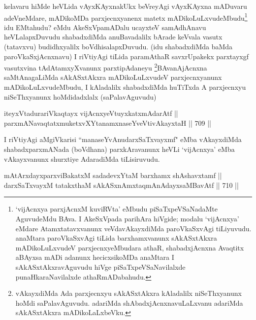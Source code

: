 \begin{artha} 
kelavaru hiMde heVLida vAyxKAyxnakUkx beVreyAgi vAyxKAyxna mADuvaru 
adeVneMdare, mADikoMDa parxjecnxyanenx matetx 
mADikoLuLxvudeMbudu\footnote{`vijAcnxya parxjAcnxM kuviRVta' eMbudu 
piSaTxpeVSaNadaMte AguvudeMdu BAva. I AkeSxVpada parihAra hiVgide; 
modalu `vijAcnxya' eMdare Atamxtatavxvanunx veVdavAkayxdiMda 
paroVkaSxvAgi tiLiyuvudu. anaMtara paroVkaSxvAgi tiLida barxhamxvanunx 
sAkASxtAkxra mADikoLuLxvudeV parxjecnxyeMbudara athaR, shabadxjAcnxna 
Avaqtitx aBAyxsa mADi adanunx hecicxsikoMDa anaMtara I 
sAkASxtAkxravAguvudu hiVge piSaTxpeVSaNavilalxde punaHkaraNavilalxde 
athaRmADabahudu.} idu EMtahudu? eMdu AkeSxVpamADalu 
ucayxteV samAdhAnavu heVLalapxDuvudu \ndash  shabadxdiMda anuBavadalilx 
bArade keVvala vasutx (tatavxvu) budidhxyalilx boVdhisalapxDuvudu. 
(idu shabadxdiMda baMda paroVkaSxjAcnxnavu) I riVtiyAgi tiLida 
paramAthaR savxrUpakekx parxtayxgf vasutxvina tAdAtamxyXvanunx 
parxtipAdaneyu \footnote{vAkayxdiMda Ada parxjecnxyu sAkASxtAkxra 
kAladalilx niSeThxyanunx hoMdi saPalavAguvudu. adariMda 
shAbadxjAcnxnavuLaLxvanu adariMda sAkASxtAkxra mADikoLaLxbeVku.}BAvanAjAcnxna saMtAnagaLiMda sAkASxtAkxra 
mADikoLuLxvudeV parxjecnxyanunx mADikoLuLxvudeMbudu, I kAladalilx 
shabadxdiMda huTiTxda A parxjecnxyu niSeThxyanunx hoMdidadxlalx 
(saPalavAguvudu) 
\end{artha}

\begin{shl}
iteyxVtadurariVkaqtayx vijAcnxyeVtuyxkatxmAdarAtf || \\
parxmANavaqtatxmuketxvXYtanamxnaseYveVtivAkayxtaH \hfill || 709 ||  
\end{shl}

\begin{artha} 
I riVtiyAgi aMgiVkarisi ``manaseYvAnudarxSaTxvayxmf" eMba vAkayxdiMda 
shabadxparxmANada (boVdhana) parxkAravanunx heVLi `vijAcnxya' eMba 
vAkayxvanunx shurxtiye AdaradiMda tiLisiruvudu.
\end{artha}


\begin{shl}
mAtArxdayxparxviBakatxM sadadevxYtaM barxhamx shAshavxtamf || \\
darxSaTxvayxM tatakxthaM sAkASxnAmxtaqmAnAdayxsaMBavAtf \hfill || 710 ||  
\end{shl}


